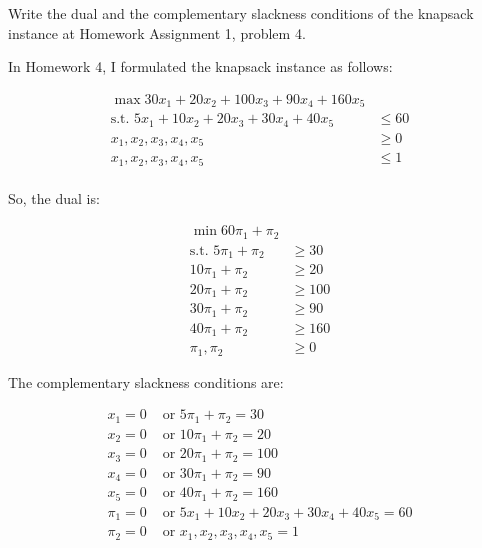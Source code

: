 \documentclass[fleqn]{homework}
\begin{document}
  \begin{problem}{3}
    \begin{question}
      Write the dual and the complementary slackness conditions of the knapsack
      instance at Homework Assignment 1, problem 4.
    \end{question}

    In Homework 4, I formulated the knapsack instance as follows:

    \begin{align*}
      \max 30x_1 + 20x_2 + 100x_3 + 90x_4 + 160 x_5 &\\
      \text{s.t. } 5x_1 + 10x_2 + 20 x_3 + 30x_4 + 40x_5 &\leq 60 \\
      x_1, x_2, x_3, x_4, x_5 &\geq 0 \\
      x_1, x_2, x_3, x_4, x_5 &\leq 1 \\
    \end{align*}

    So, the dual is:

    \begin{align*}
      \min 60\pi_1 + \pi_2 &\\
      \text{s.t. } 5\pi_1 + \pi_2 &\ge 30 \\
      10\pi_1 + \pi_2 &\ge 20 \\
      20\pi_1 + \pi_2 &\ge 100 \\
      30\pi_1 + \pi_2 &\ge 90 \\
      40\pi_1 + \pi_2 &\ge 160 \\
      \pi_1, \pi_2 &\ge 0
    \end{align*}

    The complementary slackness conditions are:

    \begin{align*}
      x_1 = 0 &\text{ or } 5\pi_1 + \pi_2 = 30 \\
      x_2 = 0 &\text{ or } 10\pi_1 + \pi_2 = 20 \\
      x_3 = 0 &\text{ or } 20\pi_1 + \pi_2 = 100 \\
      x_4 = 0 &\text{ or } 30\pi_1 + \pi_2 = 90 \\
      x_5 = 0 &\text{ or } 40\pi_1 + \pi_2 = 160 \\
      \pi_1 = 0 &\text{ or } 5x_1 + 10x_2 + 20 x_3 + 30x_4 + 40x_5 = 60 \\
      \pi_2 = 0 &\text{ or } x_1, x_2, x_3, x_4, x_5 = 1 \\
    \end{align*}
  \end{problem}
\end{document}
